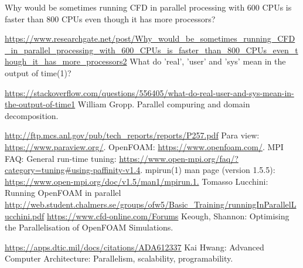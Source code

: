 \documentclass{article}
\begin{document}
\newpage
{}
\begin{thebibliography}{9} 
    \bibitem{} 
        Why would be sometimes running CFD in parallel processing with 600 CPUs is faster than 800 CPUs even though it has more processors?  

        \url{https://www.researchgate.net/post/Why_would_be_sometimes_running_CFD_in_parallel_processing_with_600_CPUs_is_faster_than_800_CPUs_even_though_it_has_more_processors2} 
        What do 'real', 'user' and 'sys' mean in the output of time(1)?

        \url{https://stackoverflow.com/questions/556405/what-do-real-user-and-sys-mean-in-the-output-of-time1}
    \bibitem{} 
        William Gropp.
        Parallel compuring and domain decomposition.

        \url{http://ftp.mcs.anl.gov/pub/tech_reports/reports/P257.pdf}
        Para view: \url{https://www.paraview.org/}.
    \bibitem{}
        OpenFOAM: \url{https://www.openfoam.com/}.
    \bibitem{}
        MPI FAQ: General run-time tuning: \url{https://www.open-mpi.org/faq/?category=tuning#using-paffinity-v1.4}.
    \bibitem{}
        mpirun(1) man page (version 1.5.5): \url{https://www.open-mpi.org/doc/v1.5/man1/mpirun.1.}
    \bibitem{}
        Tomasso Lucchini: Running OpenFOAM in parallel \url{http://web.student.chalmers.se/groups/ofw5/Basic_Training/runningInParallelLucchini.pdf}
    \bibitem{}
        \url{https://www.cfd-online.com/Forums}
    \bibitem{}
        Keough, Shannon: Optimising the Parallelisation of OpenFOAM Simulations. 

        \url{https://apps.dtic.mil/docs/citations/ADA612337}
    \bibitem{}
        Kai Hwang: Advanced Computer Architecture: Parallelism, scalability, programability.
\end{thebibliography}
\end{document}
